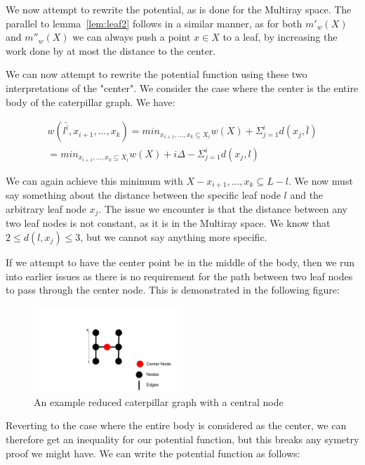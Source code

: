 We now attempt to rewrite the potential, as is done for the Multiray space. The parallel to lemma~\ref{lem:leaf2} follows in a similar manner, as for both $m'_w(X)$ and $m''_w(X)$ we can always push a point $x \in X$ to a leaf, by increasing the work done by at most the distance to the center.

We can now attempt to rewrite the potential function using these two interpretations of the "center". We consider the case where the center is the entire body of the caterpillar graph. We have:

\begin{equation*}
    \begin{gathered}
    w(\bar{l^i}, x_{i+1}, ..., x_k) = min_{x_{i+1}, ..., x_k \subseteq X_i} w(X) + \Sigma_{j=1}^i d(x_j, \bar{l})\\
    = min_{x_{i+1}, ..., x_k \subseteq X_i} w(X) + i\Delta - \Sigma_{j=1}^i d(x_j, l)
    \end{gathered}
\end{equation*}

We can again achieve this minimum with $X-x_{i+1}, ..., x_k\subseteq L-l$. We now must say something about the distance between the specific leaf node $l$ and the arbitrary leaf node $x_j$. The issue we encounter is that the distance between any two leaf nodes is not constant, as it is in the Multiray space. We know that $2 \leq d(l, x_j) \leq 3$, but we cannot say anything more specific. 

If we attempt to have the center point be in the middle of the body, then we run into earlier issues as there is no requirement for the path between two leaf nodes to pass through the center node. This is demonstrated in the following figure:

\begin{figure}[H]
    \centering
    \includegraphics[width=0.5\textwidth]{images/center2.png}
    \caption{An example reduced caterpillar graph with a central node}
\end{figure}

Reverting to the case where the entire body is considered as the center, we can therefore get an inequality for our potential function, but this breaks any symetry proof we might have. We can write the potential function as follows:

